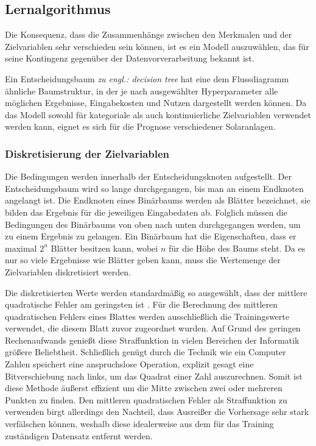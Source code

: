 \documentclass[12pt, a4paper]{article}
\begin{document}
\subsection{Lernalgorithmus}

Die Konsequenz, dass die Zusammenhänge zwischen den Merkmalen und der Zielvariablen sehr verschieden sein können, ist es ein Modell auszuwählen, das für seine Kontingenz gegenüber der Datenvorverarbeitung bekannt ist. 

Ein Entscheidungsbaum \textit{zu engl.: decision tree} hat eine dem Flussdiagramm ähnliche Baumstruktur, in der je nach ausgewählter Hyperparameter alle möglichen Ergebnisse, Eingabekosten und Nutzen dargestellt werden können. Da das Modell sowohl für kategoriale als auch kontinuierliche Zielvariablen verwendet werden kann, eignet es sich für die Prognose verschiedener Solaranlagen. 

\subsubsection{Diskretisierung der Zielvariablen}

Die Bedingungen werden innerhalb der Entscheidungsknoten aufgestellt. Der Entscheidungsbaum wird so lange durchgegangen, bis man an einem Endknoten angelangt ist. Die Endknoten eines Binärbaums werden als Blätter bezeichnet, sie bilden das Ergebnis für die jeweiligen Eingabedaten ab. Folglich müssen die Bedingungen des Binärbaums von oben nach unten durchgegangen werden, um zu einem Ergebnis zu gelangen. Ein Binärbaum hat die Eigenschaften, dass er maximal $2^{n}$ Blätter besitzen kann, wobei $n$ für die Höhe des Baums steht. Da es nur so viele Ergebnisse wie Blätter geben kann, muss die Wertemenge der Zielvariablen diskretisiert werden. 

Die diskretisierten Werte werden standardmäßig so ausgewählt, dass der mittlere quadratische Fehler am geringsten ist \cite{ws:scikit}. Für die Berechnung des mittleren quadratischen Fehlers eines Blattes werden ausschließlich die Trainingswerte verwendet, die diesem Blatt zuvor zugeordnet wurden. Auf Grund des geringen Rechenaufwands genießt diese Straffunktion in vielen Bereichen der Informatik größere Beliebtheit. Schließlich genügt durch die Technik wie ein Computer Zahlen speichert eine anspruchslose Operation, explizit gesagt eine Bitverschiebung nach links, um das Quadrat einer Zahl auszurechnen. Somit ist diese Methode äußerst effizient um die Mitte zwischen zwei oder mehreren Punkten zu finden. Den mittleren quadratischen Fehler als Straffunktion zu verwenden birgt allerdings den Nachteil, dass Ausreißer die Vorhersage sehr stark verfälschen können, weshalb diese idealerweise aus dem für das Training zuständigen Datensatz entfernt werden.
\end{document}
